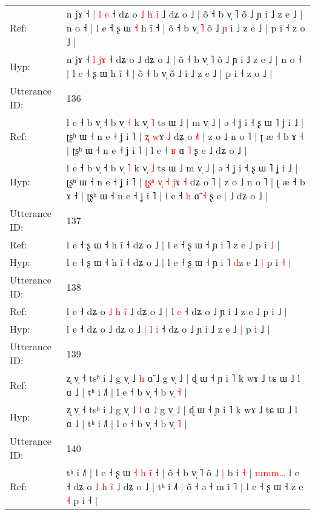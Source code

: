 \documentclass[10pt]{article}
\DeclareRobustCommand{\hl}[1]{{\textcolor{red}{#1}}}
\begin{document}
\begin{longtable}{ll}
Ref: & n jɤ ˧ \hl{|} \hl{l}\hl{ }\hl{e} ˧ dʑ o\hl{ }\hl{˩}\hl{ }\hl{h}\hl{ }\hl{i}\hl{̃} ˩ dʑ o ˩ | õ ˧ b v̩ ˥ õ ˩ ɲ i ˩ z e ˩ | n o ˧ | l e ˧ ʂ ɯ\hl{ }\hl{˧} h ĩ ˧ | õ ˧ b v̩\hl{ }\hl{˥} õ ˩\hl{ }\hl{ɲ} i ˩ z e ˩ | p i ˧ z o ˩ |
 \\
Hyp: & n jɤ ˧ \hl{l} \hl{}\hl{j}\hl{ɤ} ˧ dʑ o\hl{}\hl{}\hl{}\hl{}\hl{}\hl{}\hl{} ˩ dʑ o ˩ | õ ˧ b v̩ ˥ õ ˩ ɲ i ˩ z e ˩ | n o ˧ | l e ˧ ʂ ɯ\hl{}\hl{} h ĩ ˧ | õ ˧ b v̩\hl{}\hl{} õ ˩\hl{}\hl{} i ˩ z e ˩ | p i ˧ z o ˩ |
 \\
\midrule
Utterance ID: & 136 \\
Ref: & l e ˧ b v̩ ˧ b v̩ \hl{˧} k v̩ \hl{˥} ts ɯ ˩\hl{ }\hl{|} m v̩ ˩ | ə ˧ ʝ i ˧ ʂ ɯ ˥ ʝ i ˩ | ʈʂʰ ɯ ˧ n e ˧ ʝ i ˥ |\hl{}\hl{}\hl{}\hl{}\hl{}\hl{}\hl{} \hl{ʐ} \hl{w}ɤ \hl{˩} dʑ o \hl{˩}˥ | z o ˩ n o ˥ | ʈ æ ˧ b ɤ ˧ | ʈʂʰ ɯ ˧ n e ˧ ʝ i ˥ | l e ˧ \hl{ʁ} ɑ\hl{} \hl{˥} ʂ e\hl{}\hl{} ˩ dʑ o ˩ |
 \\
Hyp: & l e ˧ b v̩ ˧ b v̩ \hl{˥} k v̩ \hl{˩} ts ɯ ˩\hl{}\hl{} m v̩ ˩ | ə ˧ ʝ i ˧ ʂ ɯ ˥ ʝ i ˩ | ʈʂʰ ɯ ˧ n e ˧ ʝ i ˥ |\hl{ }\hl{ʈ}\hl{ʂ}\hl{ʰ}\hl{ }\hl{v}\hl{̩} \hl{˧} \hl{j}ɤ \hl{˧} dʑ o \hl{}˥ | z o ˩ n o ˥ | ʈ æ ˧ b ɤ ˧ | ʈʂʰ ɯ ˧ n e ˧ ʝ i ˥ | l e ˧ \hl{h} ɑ\hl{̃} \hl{˧} ʂ e\hl{ }\hl{|} ˩ dʑ o ˩ |
 \\
\midrule
Utterance ID: & 137 \\
Ref: & l e ˧ ʂ ɯ ˧ h ĩ ˧ dʑ o ˩ | l e ˧ ʂ ɯ ˧ ɲ i ˥ \hl{}z e ˩\hl{}\hl{} p i \hl{˩} |
 \\
Hyp: & l e ˧ ʂ ɯ ˧ h ĩ ˧ dʑ o ˩ | l e ˧ ʂ ɯ ˧ ɲ i ˥ \hl{d}z e ˩\hl{ }\hl{|} p i \hl{˧} |
 \\
\midrule
Utterance ID: & 138 \\
Ref: & l e ˧ dʑ o\hl{ }\hl{˩}\hl{ }\hl{h}\hl{ }\hl{i}\hl{̃} ˩ dʑ o ˩ | l \hl{e} ˧ dʑ o ˩ ɲ i ˩ z e ˩\hl{}\hl{} p i ˩ |
 \\
Hyp: & l e ˧ dʑ o\hl{}\hl{}\hl{}\hl{}\hl{}\hl{}\hl{} ˩ dʑ o ˩ | l \hl{i} ˧ dʑ o ˩ ɲ i ˩ z e ˩\hl{ }\hl{|} p i ˩ |
 \\
\midrule
Utterance ID: & 139 \\
Ref: & ʐ v̩ ˧ tsʰ i ˩ g v̩ ˩ \hl{h} ɑ\hl{̃} ˩ g v̩ ˩ | ɖ ɯ ˧ ɲ i ˥ k wɤ ˩ tɕ ɯ ˩ l ɑ ˩ | tʰ i ˩˥ | l e ˧ b v̩ ˧ b v̩ \hl{˧} |
 \\
Hyp: & ʐ v̩ ˧ tsʰ i ˩ g v̩ ˩ \hl{l} ɑ\hl{} ˩ g v̩ ˩ | ɖ ɯ ˧ ɲ i ˥ k wɤ ˩ tɕ ɯ ˩ l ɑ ˩ | tʰ i ˩˥ | l e ˧ b v̩ ˧ b v̩ \hl{˥} |
 \\
\midrule
Utterance ID: & 140 \\
Ref: & tʰ i ˩˥ | l e ˧ ʂ ɯ\hl{ }\hl{˧}\hl{ }\hl{h}\hl{ }\hl{i}\hl{̃} ˧ | õ ˧ b v̩ ˥ õ ˩\hl{ }\hl{|} b i \hl{˧} |\hl{ }\hl{m}\hl{m}\hl{m}\hl{…} l e ˧ dʑ o\hl{ }\hl{˩}\hl{ }\hl{h}\hl{ }\hl{i}\hl{̃} ˩ dʑ o ˩ | tʰ i ˩˥ | õ ˧\hl{}\hl{} ə ˧ m i ˥ | l e ˧ ʂ ɯ ˧ z e\hl{}\hl{} \hl{˧} p i ˧ |

\end{longtable}
\end{document}
